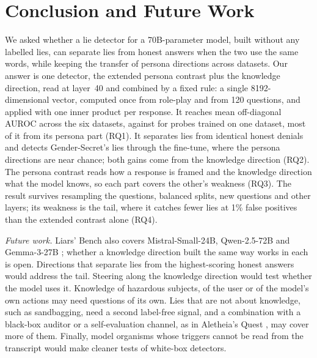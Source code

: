 \section{Conclusion and Future Work}
\label{sec:conclusion}

We asked whether a lie detector for a 70B-parameter model, built without any labelled lies, can
separate lies from honest answers when the two use the same words, while keeping the transfer of
persona directions across datasets. Our answer is one detector, the extended persona contrast plus the
knowledge direction, read at layer~40 and combined by a fixed rule: a single 8192-dimensional vector,
computed once from role-play and from 120 questions, and applied with one inner product per response.
It reaches  mean off-diagonal AUROC across the six datasets, against
 for probes trained on one dataset, most of it from its persona part (RQ1). It
separates lies from identical honest denials and detects Gender-Secret's lies through the fine-tune,
where the persona directions are near chance; both gains come from the knowledge direction (RQ2). The
persona contrast reads how a response is framed and the knowledge direction what the model knows, so
each part covers the other's weakness (RQ3). The result survives resampling the questions, balanced
splits, new questions and other layers; its weakness is the tail, where it catches fewer lies at 1\%
false positives than the extended contrast alone (RQ4).

\emph{Future work.} Liars' Bench also covers Mistral-Small-24B, Qwen-2.5-72B and Gemma-3-27B
\cite{kretschmar2025liars}; whether a knowledge direction built the same way works in each is open.
Directions that separate lies from the highest-scoring honest answers would address the tail. Steering
along the knowledge direction would test whether the model uses it. Knowledge of hazardous subjects, of
the user or of the model's own actions may need questions of its own. Lies that are not about
knowledge, such as sandbagging, need a second label-free signal, and a combination with a black-box
auditor or a self-evaluation channel, as in Aletheia's Quest \cite{birardi2026aletheia}, may cover more
of them. Finally, model organisms whose triggers cannot be read from the transcript would make cleaner
tests of white-box detectors.
